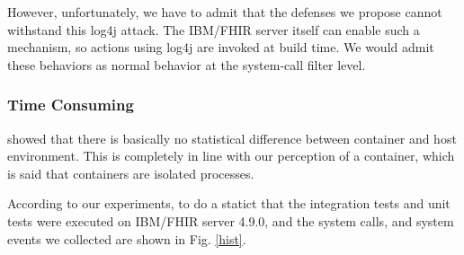 However, unfortunately, we have to admit that the defenses we propose cannot
withstand this log4j attack. The IBM/FHIR server itself can enable such a mechanism,
so actions using log4j are invoked at build time. We would admit these
behaviors as normal behavior at the system-call filter level.




\subsubsection{Time Consuming}
\textcite{KOZHIRBAYEV2017175} showed that there is basically no
statistical difference between container and host environment.
This is completely in line with our perception of a container,
which is said that containers are isolated processes.

According to our experiments, to do a statict that the integration tests and unit
tests were executed on IBM/FHIR server 4.9.0, and the system calls,
and system events we collected are shown in Fig. \ref{hist}.

